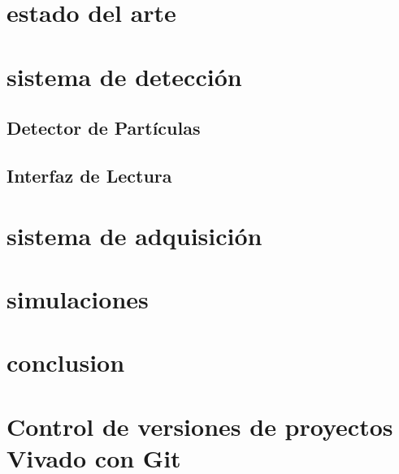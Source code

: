 \documentclass[11pt,letterpaper,oneside]{phstylee}
\begin{document}
\newpage
\thispagestyle{empty}
\cleardoublepage

\chapter{estado del arte}
\label{cap:art}


\newpage
\thispagestyle{empty}
\cleardoublepage

\chapter{sistema de detección}
\label{cap:sdet}


	\section{Detector de Partículas}
	\label{sec:stgc}
	
	
	\section{Interfaz de Lectura}
	\label{sec:asd}
	

\newpage
\thispagestyle{empty}
\cleardoublepage

\chapter{sistema de adquisición}
\label{cap:sadq}


\newpage
\thispagestyle{empty}
\cleardoublepage

\chapter{simulaciones}
\label{cap:sim}


\newpage
\thispagestyle{empty}
\cleardoublepage

\chapter{conclusion}
\label{cap:conclusiones}


\newpage
\thispagestyle{empty}
\cleardoublepage



\appendix
\chapter{Control de versiones de proyectos Vivado con Git}
\label{cap:git}

\end{document}
